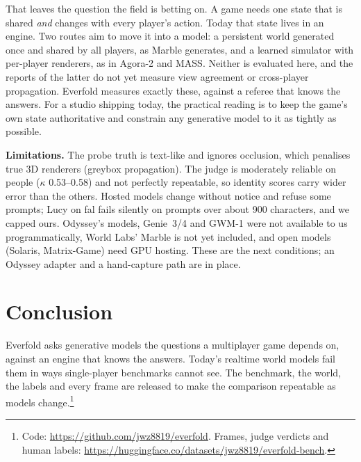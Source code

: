 \documentclass[conference]{IEEEtran}
\begin{document}
That leaves the question the field is betting on. A game needs one state that is shared \emph{and} changes with every player's action. Today that state lives in an engine. Two routes aim to move it into a model: a persistent world generated once and shared by all players, as Marble generates, and a learned simulator with per-player renderers, as in Agora-2 and MASS. Neither is evaluated here, and the reports of the latter do not yet measure view agreement or cross-player propagation. Everfold measures exactly these, against a referee that knows the answers. For a studio shipping today, the practical reading is to keep the game's own state authoritative and constrain any generative model to it as tightly as possible.

\textbf{Limitations.} The probe truth is text-like and ignores occlusion, which penalises true 3D renderers (greybox propagation). The judge is moderately reliable on people ($\kappa$ 0.53--0.58) and not perfectly repeatable, so identity scores carry wider error than the others. Hosted models change without notice and refuse some prompts; Lucy on fal fails silently on prompts over about 900 characters, and we capped ours. Odyssey's models, Genie~3/4 and GWM-1 were not available to us programmatically, World Labs' Marble is not yet included, and open models (Solaris, Matrix-Game) need GPU hosting. These are the next conditions; an Odyssey adapter and a hand-capture path are in place.

\section{Conclusion}

Everfold asks generative models the questions a multiplayer game depends on, against an engine that knows the answers. Today's realtime world models fail them in ways single-player benchmarks cannot see. The benchmark, the world, the labels and every frame are released to make the comparison repeatable as models change.\footnote{Code: \url{https://github.com/jwz8819/everfold}. Frames, judge verdicts and human labels: \url{https://huggingface.co/datasets/jwz8819/everfold-bench}.}
\end{document}
